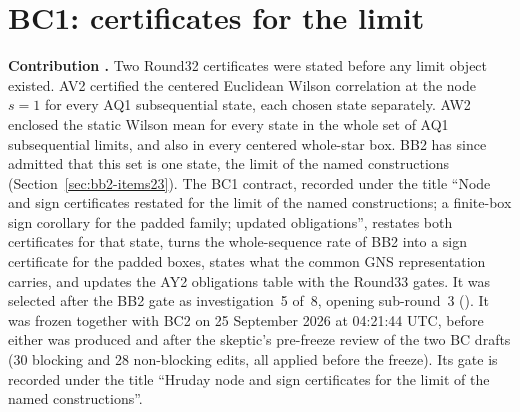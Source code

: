 \section{BC1: certificates for the limit}
\label{sec:bc1}

\textbf{Contribution .} Two Round32 certificates were
stated before any limit object existed. AV2 certified the centered Euclidean
Wilson correlation at the node $s=1$ for every AQ1 subsequential state, each
chosen state separately. AW2 enclosed the static Wilson mean for every state
in the whole set of AQ1 subsequential limits, and also in every centered
whole-star box. BB2 has since admitted that this set is one state, the limit
of the named constructions (Section~\ref{sec:bb2-items23}). The BC1 contract,
recorded under the title ``Node and sign certificates restated for the limit
of the named constructions; a finite-box sign corollary for the padded
family; updated obligations'', restates both certificates for that state,
turns the whole-sequence rate of BB2 into a sign certificate for the padded
boxes, states what the common GNS representation carries, and updates the
AY2 obligations table with the Round33 gates. It was selected after the BB2
gate as investigation~5 of~8, opening sub-round~3
(). It was
frozen together with BC2 on 25 September 2026 at 04:21:44 UTC, before either
was produced and after the
skeptic's pre-freeze review of the two BC drafts (30 blocking and 28
non-blocking edits, all applied before the freeze). Its gate is recorded
under the title ``Hruday node and sign certificates for the limit of the
named constructions''.

